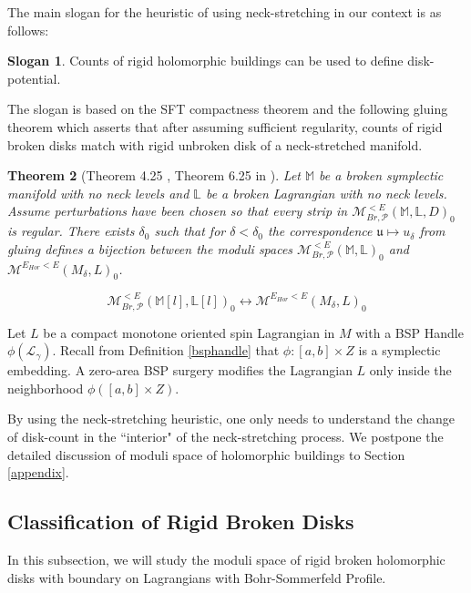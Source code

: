 \documentclass[11pt, oneside,dvipsnames]{amsart}
\newcommand{\<}{\langle}
\renewcommand{\>}{\rangle}
\newcommand{\M}{\mathcal{M}}
\newcommand{\cL}{\mathcal{L}}
\newtheorem{Theorem}{Theorem}[section]
\theoremstyle{definition}
\newtheorem{slogan}[Theorem]{Slogan}
\newenvironment{fslogan}
  {\begin{mdframed}\begin{slogan}}
  {\end{slogan}\end{mdframed}}
\theoremstyle{definition}
\numberwithin{equation}{subsection}
\begin{document}
The main slogan for the heuristic of using neck-stretching in our context is as follows:
\vspace{5pt}
\begin{fslogan}
    Counts of rigid holomorphic buildings  can be used to define disk-potential. 
\end{fslogan}
The slogan is based on the SFT compactness theorem and the following gluing theorem which asserts that after assuming sufficient regularity, counts of rigid broken disks match with rigid unbroken disk of a neck-stretched manifold.


\begin{Theorem}[Theorem 4.25 \cite{Cha23}, Theorem 6.25 in \cite{PW19}]\label{gluingglimpse}
    Let $\mathbb M$ be a broken symplectic manifold with no neck levels and $\mathbb L$  be a broken Lagrangian with no neck levels.  Assume perturbations have been chosen so that every strip in $\mathcal{M}^{<E}_{Br,\mathcal{P}}(\mathbb{M},\mathbb{L},D)_0$ is regular. There exists $\delta_0$ such that for $ \delta <\delta_0$ the correspondence $\mathfrak{u} \mapsto u_\delta$ from gluing defines a bijection between the moduli spaces $\M^{<E}_{Br,\mathcal{P}}(\mathbb{M},\mathbb{L})_0$ and $\mathcal M ^{E_{Hor}< E}(M_{\delta},L)_0$.



$$\M^{<E}_{Br,\mathcal{P}}(\mathbb{M}[l],\mathbb{L}[l])_0 \leftrightarrow \mathcal M ^{E_{Hor}< E}(M_{\delta},L)_0$$
\end{Theorem}

Let $L$ be a compact monotone oriented spin Lagrangian in $M$  with a BSP Handle $\phi(\cL_\gamma)$. Recall from Definition \ref{bsphandle} that $\phi : [a,b]\times Z$ is a symplectic embedding. A zero-area BSP surgery modifies the Lagrangian $L$ only inside the neighborhood $\phi([a,b] \times Z)$. 

By using the neck-stretching heuristic, one only needs to understand the change of disk-count in the ``interior"  of the neck-stretching process. We postpone the detailed discussion of moduli space of holomorphic buildings to Section \ref{appendix}.

\subsection{Classification of Rigid Broken Disks}

In this subsection, we will study the moduli space of  rigid broken holomorphic disks with boundary on Lagrangians with Bohr-Sommerfeld Profile.
\end{document}
